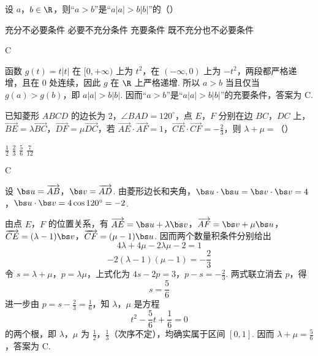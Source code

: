 \begin{problem}
设 \(a\)，\(b\in\R\)，则“\(a > b\)”是“\(a|a| > b|b|\)”的（\quad）

\choices
    {充分不必要条件}
    {必要不充分条件}
    {充要条件}
    {既不充分也不必要条件}
\end{problem}

\begin{answer}
C
\end{answer}

\begin{solution}
函数 \(g(t)=t|t|\) 在 \([0,+\infty)\) 上为 \(t^2\)，在 \((-\infty,0)\) 上为 \(-t^2\)，两段都严格递增，且在 \(0\) 处连续，因此 \(g\) 在 \(\R\) 上严格递增. 所以 \(a>b\) 当且仅当 \(g(a)>g(b)\)，即 \(a|a|>b|b|\). 因而“\(a>b\)”是“\(a|a|>b|b|\)”的充要条件，答案为 C.
\end{solution}

\begin{problem}
已知菱形 \(ABCD\) 的边长为 \(2\)，\(\angle BAD = 120^{\circ}\)，点 \(E\)，\(F\) 分别在边 \(BC\)，\(DC\) 上，\(\overrightarrow{BE} = \lambda\overrightarrow{BC}\)，\(\overrightarrow{DF} = \mu\overrightarrow{DC}\)，若 \(\overrightarrow{AE} \cdot \overrightarrow{AF} = 1\)，\(\overrightarrow{CE} \cdot \overrightarrow{CF} = -\frac{2}{3}\)，则 \(\lambda + \mu =\)（\quad）

\choices
    {\(\frac{1}{2}\)}
    {\(\frac{2}{3}\)}
    {\(\frac{5}{6}\)}
    {\(\frac{7}{12}\)}
\end{problem}

\begin{answer}
C
\end{answer}

\begin{solution}
设 \(\bs u=\overrightarrow{AB}\)，\(\bs v=\overrightarrow{AD}\). 由菱形边长和夹角，\(\bs u\cdot\bs u=\bs v\cdot\bs v=4\)，\(\bs u\cdot\bs v=4\cos120^\circ=-2\).

由点 \(E\)，\(F\) 的位置关系，有 \(\overrightarrow{AE}=\bs u+\lambda\bs v\)，\(\overrightarrow{AF}=\bs v+\mu\bs u\)，\(\overrightarrow{CE}=(\lambda-1)\bs v\)，\(\overrightarrow{CF}=(\mu-1)\bs u\). 因而两个数量积条件分别给出
\[
4\lambda+4\mu-2\lambda\mu-2=1
\]
\[
-2(\lambda-1)(\mu-1)=-\frac23
\]
令 \(s=\lambda+\mu\)，\(p=\lambda\mu\)，上式化为 \(4s-2p=3\)，\(p-s=-\frac23\). 两式联立消去 \(p\)，得
\[
s=\frac56
\]
进一步由 \(p=s-\frac23=\frac16\)，知 \(\lambda\)，\(\mu\) 是方程
\[
t^2-\frac56t+\frac16=0
\]
的两个根，即 \(\lambda\)，\(\mu\) 为 \(\frac12\)，\(\frac13\)（次序不定），均确实属于区间 \([0,1]\). 因而 \(\lambda+\mu=\frac56\)，答案为 C.
\end{solution}

